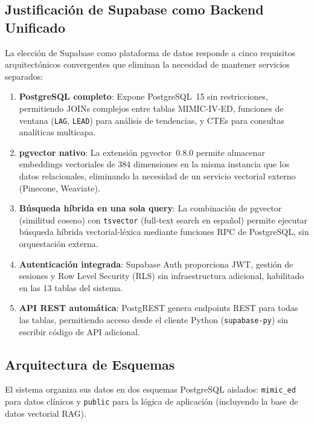 ﻿\documentclass[11pt,a4paper]{article}
\begin{document}
\subsection{Justificaci\'on de Supabase como Backend Unificado}

La elecci\'on de Supabase como plataforma de datos responde a cinco requisitos arquitect\'onicos convergentes que eliminan la necesidad de mantener servicios separados:

\begin{enumerate}
  \item \textbf{PostgreSQL completo}: Expone PostgreSQL~15 sin restricciones, permitiendo JOINs complejos entre tablas MIMIC-IV-ED, funciones de ventana (\texttt{LAG}, \texttt{LEAD}) para an\'alisis de tendencias, y CTEs para consultas anal\'iticas multicapa.
  \item \textbf{pgvector nativo}: La extensi\'on pgvector~0.8.0 permite almacenar embeddings vectoriales de 384 dimensiones en la misma instancia que los datos relacionales, eliminando la necesidad de un servicio vectorial externo (Pinecone, Weaviate).
  \item \textbf{B\'usqueda h\'ibrida en una sola query}: La combinaci\'on de pgvector (similitud coseno) con \texttt{tsvector} (full-text search en espa\~nol) permite ejecutar b\'usqueda h\'ibrida vectorial-l\'exica mediante funciones RPC de PostgreSQL, sin orquestaci\'on externa.
  \item \textbf{Autenticaci\'on integrada}: Supabase Auth proporciona JWT, gesti\'on de sesiones y Row Level Security (RLS) sin infraestructura adicional, habilitado en las 13 tablas del sistema.
  \item \textbf{API REST autom\'atica}: PostgREST genera endpoints REST para todas las tablas, permitiendo acceso desde el cliente Python (\texttt{supabase-py}) sin escribir c\'odigo de API adicional.
\end{enumerate}

\subsection{Arquitectura de Esquemas}

El sistema organiza sus datos en dos esquemas PostgreSQL aislados: \texttt{mimic\_ed} para datos cl\'inicos y \texttt{public} para la l\'ogica de aplicaci\'on (incluyendo la base de datos vectorial RAG).
\end{document}
